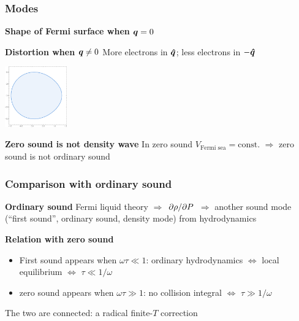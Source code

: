 \documentclass{beamer}
\begin{document}
\begin{frame}
\frametitle{Modes}

\textbf{Shape of Fermi surface when $\vb*{q} = 0$}

\begin{center}
    
\end{center}

\textbf{Distortion when $\vb*{q} \neq 0$} More electrons in $\vu*{q}$; less electrons in $- \vu*{q}$

\begin{center}
    \includegraphics[width=0.2\textwidth]{spatial/zero-sound-l-0.png}
\end{center}

\textbf{Zero sound is not density wave} In zero sound $V_{\text{Fermi sea}} = \text{const}.$
$\Rightarrow$ zero sound is not ordinary sound

\end{frame}

\begin{frame}
\frametitle{Comparison with ordinary sound}

\textbf{Ordinary sound} Fermi liquid theory $\Rightarrow$ $\pdv*{\rho}{P}$ $\Rightarrow$
another sound mode (``first sound'', ordinary sound, density mode) from hydrodynamics

\vspace{0.5cm}

\textbf{Relation with zero sound} 
\begin{itemize}
    \item First sound appears when $\omega \tau \ll 1$:
    ordinary hydrodynamics $\Leftrightarrow$ local equilibrium $\Leftrightarrow$ $\tau \ll 1 / \omega$
    \item zero sound appears when $\omega \tau \gg 1$: 
    no collision integral $\Leftrightarrow$ $\tau \gg 1 / \omega$
\end{itemize}

The two are connected: a radical finite-$T$ correction

\begin{center}
    
\end{center}    

\end{frame}
\end{document}
